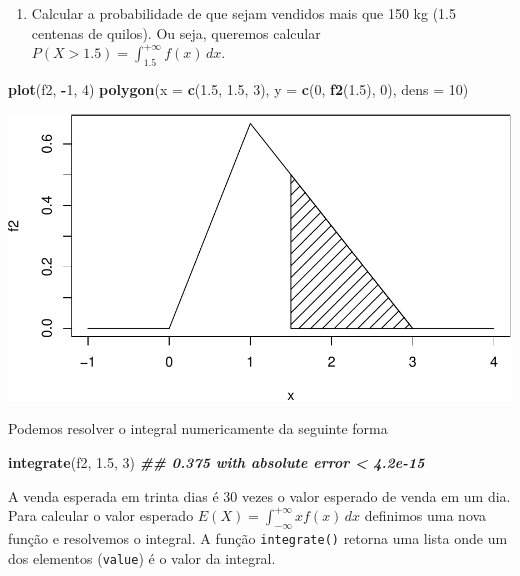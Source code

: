 \documentclass[
]{book}
\newenvironment{Shaded}{\begin{snugshade}}{\end{snugshade}}
\newcommand{\AttributeTok}[1]{\textcolor[rgb]{0.13,0.29,0.53}{#1}}
\newcommand{\DecValTok}[1]{\textcolor[rgb]{0.00,0.00,0.81}{#1}}
\newcommand{\DocumentationTok}[1]{\textcolor[rgb]{0.56,0.35,0.01}{\textbf{\textit{#1}}}}
\newcommand{\FloatTok}[1]{\textcolor[rgb]{0.00,0.00,0.81}{#1}}
\newcommand{\FunctionTok}[1]{\textcolor[rgb]{0.13,0.29,0.53}{\textbf{#1}}}
\newcommand{\NormalTok}[1]{#1}
\newcommand{\SpecialCharTok}[1]{\textcolor[rgb]{0.81,0.36,0.00}{\textbf{#1}}}
\providecommand{\tightlist}{%
  \setlength{\itemsep}{0pt}\setlength{\parskip}{0pt}}
\begin{document}
\begin{enumerate}
\def\labelenumi{(\alph{enumi})}
\tightlist
\item
  Calcular a probabilidade de que sejam vendidos mais que 150 kg (1.5 centenas de quilos). Ou seja, queremos calcular \(P(X>1.5) = \int_{1.5}^{+\infty}f(x)\,dx\).
\end{enumerate}

\begin{Shaded}
\begin{Highlighting}[]
\FunctionTok{plot}\NormalTok{(f2, }\SpecialCharTok{{-}}\DecValTok{1}\NormalTok{, }\DecValTok{4}\NormalTok{)}
\FunctionTok{polygon}\NormalTok{(}\AttributeTok{x =} \FunctionTok{c}\NormalTok{(}\FloatTok{1.5}\NormalTok{, }\FloatTok{1.5}\NormalTok{, }\DecValTok{3}\NormalTok{), }\AttributeTok{y =} \FunctionTok{c}\NormalTok{(}\DecValTok{0}\NormalTok{, }\FunctionTok{f2}\NormalTok{(}\FloatTok{1.5}\NormalTok{), }\DecValTok{0}\NormalTok{), }\AttributeTok{dens =} \DecValTok{10}\NormalTok{)}
\end{Highlighting}
\end{Shaded}

\includegraphics{introR_files/figure-latex/unnamed-chunk-241-1.pdf}

Podemos resolver o integral numericamente da seguinte forma

\begin{Shaded}
\begin{Highlighting}[]
\FunctionTok{integrate}\NormalTok{(f2, }\FloatTok{1.5}\NormalTok{, }\DecValTok{3}\NormalTok{)}
\DocumentationTok{\#\# 0.375 with absolute error \textless{} 4.2e{-}15}
\end{Highlighting}
\end{Shaded}

A venda esperada em trinta dias é 30 vezes o valor esperado de venda em um dia. Para calcular o valor esperado \(E(X) = \int_{-\infty}^{+\infty}xf(x)\,dx\) definimos uma nova função e resolvemos o integral. A função \texttt{integrate()} retorna uma lista onde um dos elementos (\texttt{value}) é o valor da integral.
\end{document}
